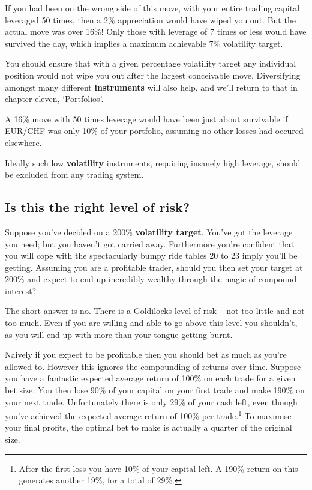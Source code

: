 If you had been on the wrong side of this move, with your entire trading capital leveraged 50 times, then a 2\% appreciation would have wiped you out. But the actual move was over 16\%! Only those with leverage of 7 times or less would have survived the day, which implies a maximum achievable 7\% volatility target.

You should ensure that with a given percentage volatility target any individual position would not wipe you out after the largest conceivable move. Diversifying amongst many different \textbf{instruments} will also help, and we'll return to that in chapter eleven, ‘Portfolios'.

A 16\% move with 50 times leverage would have been just about survivable if EUR/CHF was only 10\% of your portfolio, assuming no other losses had occured elsewhere.

Ideally such low \textbf{volatility} instruments, requiring insanely high leverage, should be excluded from any trading system.

\subsection*{Is this the right level of risk?}

Suppose you've decided on a 200\% \textbf{volatility target}. You've got the leverage you need; but you haven't got carried away. Furthermore you're confident that you will cope with the spectacularly bumpy ride tables 20 to 23 imply you'll be getting. Assuming you are a profitable trader, should you then set your target at 200\% and expect to end up incredibly wealthy through the magic of compound interest?

The short answer is no. There is a Goldilocks level of risk -- not too little and not too much. Even if you are willing and able to go above this level you shouldn't, as you will end up with more than your tongue getting burnt.

Naively if you expect to be profitable then you should bet as much as you're allowed to. However this ignores the compounding of returns over time. Suppose you have a fantastic expected average return of 100\% on each trade for a given bet size. You then lose 90\% of your capital on your first trade and make 190\% on your next trade. Unfortunately there is only 29\% of your cash left, even though you've achieved the expected average return of 100\% per trade.\footnote{After the first loss you have 10\% of your capital left. A 190\% return on this generates another 19\%, for a total of 29\%.} To maximise your final profits, the optimal bet to make is actually a quarter of the original size.


